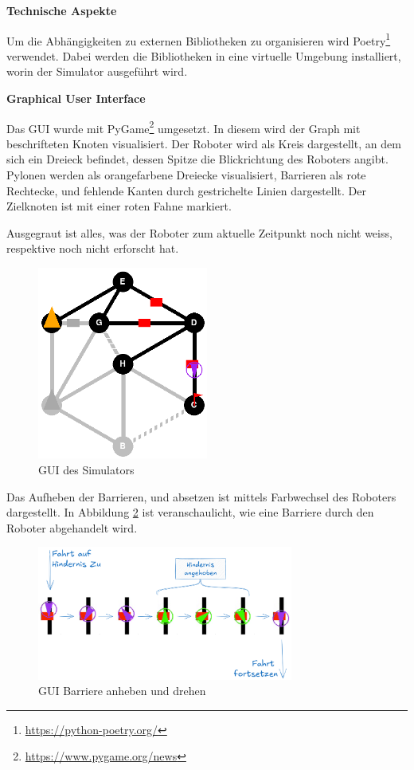\textbf{Technische Aspekte}\label{technical-aspect-simulator}

Um die Abhängigkeiten zu externen Bibliotheken zu organisieren wird Poetry\footnote{\url{https://python-poetry.org/}} verwendet. Dabei werden die Bibliotheken in eine virtuelle Umgebung installiert, worin der Simulator ausgeführt wird.

\textbf{Graphical User Interface}\label{gui}

Das GUI wurde mit PyGame\footnote{\url{https://www.pygame.org/news}} umgesetzt. In diesem wird der Graph mit beschrifteten Knoten visualisiert. Der Roboter wird als Kreis dargestellt, an dem sich ein Dreieck befindet, dessen Spitze die Blickrichtung des Roboters angibt. Pylonen werden als orangefarbene Dreiecke visualisiert, Barrieren als rote Rechtecke, und fehlende Kanten durch gestrichelte Linien dargestellt. Der Zielknoten ist mit einer roten Fahne markiert.

Ausgegraut ist alles, was der Roboter zum aktuelle Zeitpunkt noch nicht weiss, respektive noch nicht erforscht hat.

\begin{figure}[H]
\centering
\includegraphics[width=0.5\textwidth]{assets/informatik-prototyp/simulator/sim-ui.png}
\caption{GUI des Simulators}
\label{fig:sim-gui}
\end{figure}

Das Aufheben der Barrieren, und absetzen ist mittels Farbwechsel des Roboters dargestellt.
In Abbildung \ref{fig:sim-gui-barrier-flow} ist veranschaulicht, wie eine Barriere durch den Roboter abgehandelt wird.

\begin{figure}[H]
\centering
\includegraphics[width=0.75\textwidth]{assets/informatik-prototyp/simulator/sim-ui-barrier-flow.png}
\caption{GUI Barriere anheben und drehen}
\label{fig:sim-gui-barrier-flow}
\end{figure}




